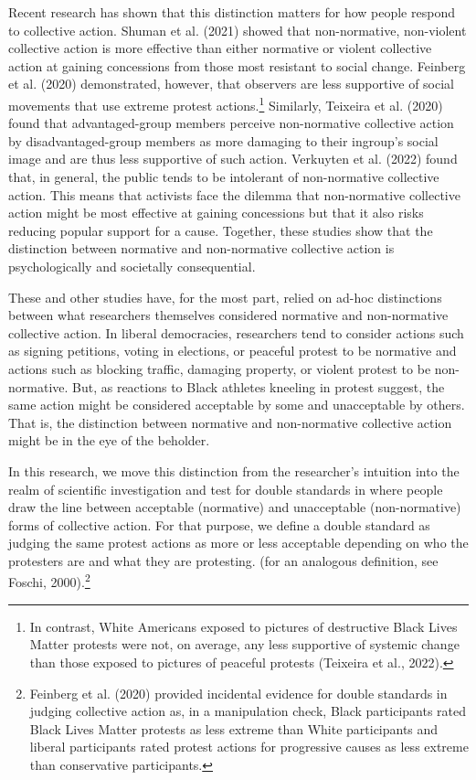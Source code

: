 \documentclass[12pt, letterpaper]{article}
\begin{document}
Recent research has shown that this distinction matters for how people
respond to collective action. Shuman et al. (2021) showed that
non-normative, non-violent collective action is more effective than
either normative or violent collective action at gaining concessions
from those most resistant to social change. Feinberg et al. (2020)
demonstrated, however, that observers are less supportive of social
movements that use extreme protest actions.\footnote{In contrast, White
  Americans exposed to pictures of destructive Black Lives Matter
  protests were not, on average, any less supportive of systemic change
  than those exposed to pictures of peaceful protests (Teixeira et al.,
  2022).} Similarly, Teixeira et al. (2020) found that advantaged-group
members perceive non-normative collective action by disadvantaged-group
members as more damaging to their ingroup's social image and are thus
less supportive of such action. Verkuyten et al. (2022) found that, in
general, the public tends to be intolerant of non-normative collective
action. This means that activists face the dilemma that non-normative
collective action might be most effective at gaining concessions but
that it also risks reducing popular support for a cause. Together, these
studies show that the distinction between normative and non-normative
collective action is psychologically and societally consequential.

These and other studies have, for the most part, relied on ad-hoc
distinctions between what researchers themselves considered normative
and non-normative collective action. In liberal democracies, researchers
tend to consider actions such as signing petitions, voting in elections,
or peaceful protest to be normative and actions such as blocking
traffic, damaging property, or violent protest to be non-normative. But,
as reactions to Black athletes kneeling in protest suggest, the same
action might be considered acceptable by some and unacceptable by
others. That is, the distinction between normative and non-normative
collective action might be in the eye of the beholder.

In this research, we move this distinction from the researcher's
intuition into the realm of scientific investigation and test for double
standards in where people draw the line between acceptable (normative)
and unacceptable (non-normative) forms of collective action. For that
purpose, we define a double standard as judging the same protest actions
as more or less acceptable depending on who the protesters are and what
they are protesting. (for an analogous definition, see Foschi,
2000).\footnote{Feinberg et al. (2020) provided incidental evidence for
  double standards in judging collective action as, in a manipulation
  check, Black participants rated Black Lives Matter protests as less
  extreme than White participants and liberal participants rated protest
  actions for progressive causes as less extreme than conservative
  participants.}
\end{document}
